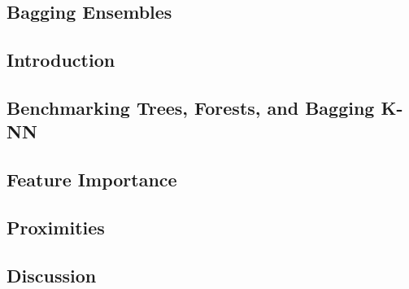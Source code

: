 

\subsection{Bagging Ensembles}


\subsection{Introduction}


\subsection{Benchmarking Trees, Forests, and Bagging K-NN}


\subsection{Feature Importance}


\subsection{Proximities}


\subsection{Discussion}
